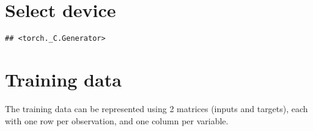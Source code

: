\documentclass[]{book}
\newenvironment{Shaded}{\begin{snugshade}}{\end{snugshade}}
\newcommand{\DecValTok}[1]{\textcolor[rgb]{0.00,0.00,0.81}{#1}}
\newcommand{\KeywordTok}[1]{\textcolor[rgb]{0.13,0.29,0.53}{\textbf{#1}}}
\newcommand{\NormalTok}[1]{#1}
\newcommand{\OperatorTok}[1]{\textcolor[rgb]{0.81,0.36,0.00}{\textbf{#1}}}
\newcommand{\StringTok}[1]{\textcolor[rgb]{0.31,0.60,0.02}{#1}}
\begin{document}
\hypertarget{select-device}{%
\section{Select device}\label{select-device}}

\begin{Shaded}
\end{Shaded}

\begin{verbatim}
## <torch._C.Generator>
\end{verbatim}

\begin{Shaded}
\end{Shaded}

\hypertarget{training-data}{%
\section{Training data}\label{training-data}}

The training data can be represented using 2 matrices (inputs and targets), each with one row per observation, and one column per variable.
\end{document}
